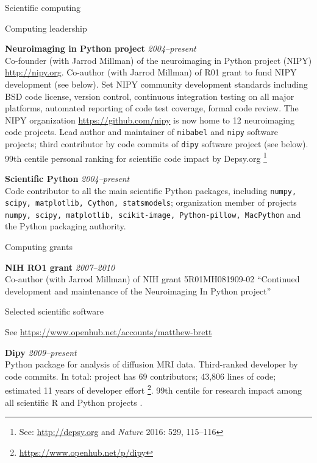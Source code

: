 \documentclass{cv}
\newcommand{\PlaceDateNote}[3]{{\bf #1} \hfill {\em #2} \\#3}
\newcommand{\Pkg}[1]{{\tt #1}}
\begin{document}
\begin{cvSection}{Scientific computing}

\begin{cvSubSection}{Computing leadership}

\PlaceDateNote{Neuroimaging in Python project}{2004--present}
{Co-founder (with Jarrod Millman) of the neuroimaging in Python project (NIPY)
    \url{http://nipy.org}.  Co-author (with Jarrod Millman) of R01 grant to
    fund NIPY development (see below).  Set
    NIPY community development standards including BSD code license, version
    control, continuous integration testing on all major platforms, automated
    reporting of code test coverage, formal code review.  The NIPY
    organization \url{https://github.com/nipy} is now home to 12 neuroimaging
code projects.  Lead author and maintainer of \Pkg{nibabel} and \Pkg{nipy}
software projects; third contributor by code commits of \Pkg{dipy} software
project (see below).  99th centile personal ranking for scientific code impact
by Depsy.org \footnote{See: \url{http://depsy.org} and {\em Nature} 2016: 529,
115–116\label{depsy}}}

\PlaceDateNote{Scientific Python}{2004--present}
{Code contributor to all the main scientific Python packages, including
    \Pkg{numpy, scipy, matplotlib, Cython, statsmodels}; organization member
    of projects \Pkg{numpy, scipy, matplotlib, scikit-image, Python-pillow,
MacPython} and the Python packaging authority.}

\end{cvSubSection}

\begin{cvSubSection}{Computing grants}

\PlaceDateNote{NIH RO1 grant}{2007--2010}
{Co-author (with Jarrod Millman) of NIH grant 5R01MH081909-02 ``Continued
development and maintenance of the Neuroimaging In Python project''}

\end{cvSubSection}

\begin{cvSubSection}{Selected scientific software}

See \url{https://www.openhub.net/accounts/matthew-brett}

\PlaceDateNote{Dipy}{2009--present}
{Python package for analysis of diffusion MRI data.  Third-ranked developer by
    code commits.  In total: project has 69 contributors; 43,806 lines of code;
    estimated 11 years of developer effort
\footnote{\url{https://www.openhub.net/p/dipy}}. 99th centile for research
impact among all scientific R and Python projects \footref{depsy}.}


\end{cvSubSection}
\end{cvSection}
\end{document}

